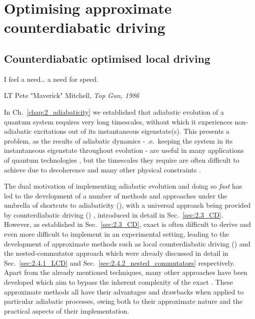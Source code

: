 \part{Optimising approximate counterdiabatic driving}

\chapter{Counterdiabatic optimised local driving}\label{chap:4_COLD}

\epigraph{I feel a need… a need for speed.}{LT Pete "Maverick" Mitchell, \emph{Top Gun, 1986}}

In Ch.~\ref{chap:2_adiabaticity} we established that adiabatic evolution of a quantum system requires very long timescales, without which it experiences non-adiabatic excitations out of its instantaneous eigenstate(s). This presents a problem, as the results of adiabatic dynamics - \@i.e.~keeping the system in its instantaneous eigenstate throughout evolution - are useful in many applications of quantum technologies \cite{dimitrova_many-body_2023, campo_more_2014, ebadi_quantum_2022}, but the timescales they require are often difficult to achieve due to decoherence and many other physical constraints . 

The dual motivation of implementing adiabatic evolution and doing so \emph{fast} has led to the development of a number of methods and approaches under the umbrella of shortcuts to adiabaticity ()\cite{guery-odelin_shortcuts_2019}, with a universal  approach being provided by counterdiabatic driving () \cite{berry_transitionless_2009, demirplak_adiabatic_2003}, introduced in detail in Sec.~\ref{sec:2.3_CD}. However, as established in Sec.~\ref{sec:2.3_CD}, exact  is often difficult to derive and even more difficult to implement in an experimental setting, leading to the development of approximate methods such as local counterdiabatic driving \cite{sels_minimizing_2017} () and the nested-commutator approach \cite{claeys_floquet-engineering_2019} which were already discussed in detail in Sec.~\ref{sec:2.4.1_LCD} and Sec.~\ref{sec:2.4.2_nested_commutators} respectively. Apart from the already mentioned techniques, many other approaches \cite{saberi_adiabatic_2014, campbell_shortcut_2015, whitty_quantum_2020} have been developed which aim to bypass the inherent complexity of the exact . These approximate methods all have their advantages and drawbacks when applied to particular adiabatic processes, owing both to their approximate nature and the practical aspects of their implementation.  

